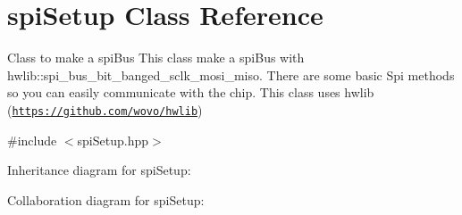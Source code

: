 \hypertarget{classspiSetup}{}\section{spi\+Setup Class Reference}
\label{classspiSetup}


Class to make a spi\+Bus  This class make a spi\+Bus with hwlib\+::spi\+\_\+bus\+\_\+bit\+\_\+banged\+\_\+sclk\+\_\+mosi\+\_\+miso. There are some basic Spi methods so you can easily communicate with the chip. This class uses hwlib (\href{https://github.com/wovo/hwlib}{\tt https\+://github.\+com/wovo/hwlib})  




{\ttfamily \#include $<$spi\+Setup.\+hpp$>$}



Inheritance diagram for spi\+Setup\+:


Collaboration diagram for spi\+Setup\+:

